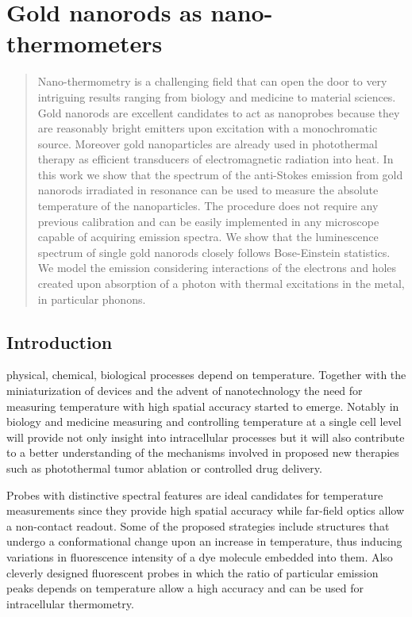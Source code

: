\chapter{Gold nanorods as nano-thermometers}
\label{ch:AntiStokes}

\begin{abstract}
Nano-thermometry is a challenging field that can open the door to very
intriguing results ranging from biology and medicine to material sciences. Gold
nanorods are excellent candidates to act as nanoprobes because they are
reasonably bright emitters upon excitation with a monochromatic source.
Moreover gold nanoparticles are already used in photothermal therapy as efficient
transducers of electromagnetic radiation into heat. In this work we show that
the spectrum of the anti-Stokes emission from gold nanorods irradiated in
resonance can be used to measure the absolute temperature of the nanoparticles.
The procedure does not require any previous calibration and can be easily
implemented in any microscope capable of acquiring emission spectra. We show
that the luminescence spectrum of single gold nanorods closely follows
Bose-Einstein statistics. We model the emission considering interactions of the
electrons and holes created upon absorption of a photon with thermal excitations
in the metal, in particular phonons.
\end{abstract}

\newpage

\section{Introduction}
 physical, chemical, biological processes depend on temperature.
Together with the miniaturization of devices and the advent of nanotechnology the need
for measuring temperature with high spatial accuracy started to emerge. Notably
in biology\cite{Yang2011a,Hrelescu2010} and medicine\cite{Li2013c} measuring and
controlling temperature at a single cell level will provide not only insight
into intracellular processes but it will also contribute to a better
understanding of the mechanisms involved in proposed new therapies such as
photothermal tumor ablation\cite{Gobin2007} or controlled drug
delivery\cite{Huang2006,Huo2014}. 

Probes with distinctive spectral features are ideal candidates for temperature
measurements since they provide high spatial accuracy while far-field optics
allow a non-contact readout. Some of the proposed strategies include structures
that undergo a conformational change upon an increase in
temperature\cite{Ebrahimi2014}, thus inducing variations in fluorescence
intensity of a dye molecule embedded into them. Also cleverly designed
fluorescent probes\cite{Vetrone2010} in which the ratio of particular emission
peaks depends on temperature allow a high accuracy and can be used for
intracellular thermometry.

